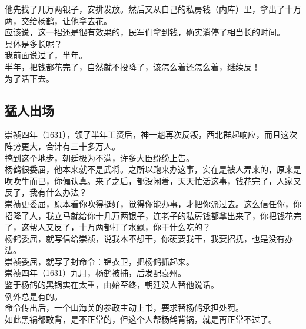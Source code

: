\begin{multicols}{\theparacolNo}
他先找了几万两银子，安排发放。然后又从自己的私房钱（内库）里，拿出了十万两，交给杨鹤，让他拿去花。\\

应该说，这一招还是很有效果的，民军们拿到钱，确实消停了相当长的时间。\\

具体是多长呢？\\

我前面说过了，半年。\\

半年，把钱都花完了，自然就不投降了，该怎么着还怎么着，继续反！\\

为了活下去。\\

\subsection{猛人出场}
崇祯四年（1631），领了半年工资后，神一魁再次反叛，西北群起响应，而且这次阵势更大，合计有三十多万人。\\

搞到这个地步，朝廷极为不满，许多大臣纷纷上告。\\

杨鹤很委屈，他本来就不是武将。之所以跑来办这事，实在是被人弄来的，原来是吹吹牛而已，你偏认真。来了之后，都没闲着，天天忙活这事，钱花完了，人家又反了，我有什么办法？\\

崇祯更委屈，原本看你吹得挺好，觉得你能办事，才把你派过去。这么信任你，你招降了人，我立马就给你十几万两银子，连老子的私房钱都拿出来了，你把钱花完了，这帮人又反了，十万两都打了水飘，你干什么吃的？\\

杨鹤委屈，就写信给崇祯，说我本不想干，你硬要我干，我要招抚，也是没有办法。\\

崇祯委屈，就写了封命令：锦衣卫，把杨鹤抓起来。\\

崇祯四年（1631）九月，杨鹤被捕，后发配袁州。\\

鉴于杨鹤的黑锅实在太重，由始至终，朝廷没人替他说话。\\

例外总是有的。\\

命令传出后，一个山海关的参政主动上书，要求替杨鹤承担处罚。\\

如此黑锅都敢背，是不正常的，但这个人帮杨鹤背锅，就是再正常不过了。\\


\end{multicols}
